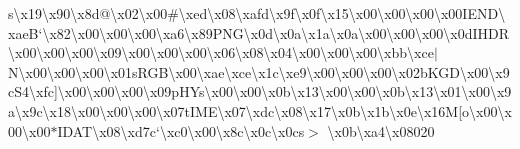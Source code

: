 \begin{DoxyCompactItemize}
s\textbackslash{}x19\textbackslash{}x90\textbackslash{}x8d@\textbackslash{}x02\textbackslash{}x00\#\textbackslash{}xed\textbackslash{}x08\textbackslash{}xafd\textbackslash{}x9f\textbackslash{}x0f\textbackslash{}x15\textbackslash{}x00\textbackslash{}x00\textbackslash{}x00\textbackslash{}x00\+I\+E\+N\+D\textbackslash{}xae\+B`\textbackslash{}x82\textbackslash{}x00\textbackslash{}x00\textbackslash{}x00\textbackslash{}xa6\textbackslash{}x89\+P\+N\+G\textbackslash{}x0d\textbackslash{}x0a\textbackslash{}x1a\textbackslash{}x0a\textbackslash{}x00\textbackslash{}x00\textbackslash{}x00\textbackslash{}x0d\+I\+H\+D\+R\textbackslash{}x00\textbackslash{}x00\textbackslash{}x00\textbackslash{}x09\textbackslash{}x00\textbackslash{}x00\textbackslash{}x00\textbackslash{}x06\textbackslash{}x08\textbackslash{}x04\textbackslash{}x00\textbackslash{}x00\textbackslash{}x00\textbackslash{}xbb\textbackslash{}xce$\vert$\+N\textbackslash{}x00\textbackslash{}x00\textbackslash{}x00\textbackslash{}x01s\+R\+G\+B\textbackslash{}x00\textbackslash{}xae\textbackslash{}xce\textbackslash{}x1c\textbackslash{}xe9\textbackslash{}x00\textbackslash{}x00\textbackslash{}x00\textbackslash{}x02b\+K\+G\+D\textbackslash{}x00\textbackslash{}x9c\+S4\textbackslash{}xfc\mbox{]}\textbackslash{}x00\textbackslash{}x00\textbackslash{}x00\textbackslash{}x09p\+H\+Ys\textbackslash{}x00\textbackslash{}x00\textbackslash{}x0b\textbackslash{}x13\textbackslash{}x00\textbackslash{}x00\textbackslash{}x0b\textbackslash{}x13\textbackslash{}x01\textbackslash{}x00\textbackslash{}x9a\textbackslash{}x9c\textbackslash{}x18\textbackslash{}x00\textbackslash{}x00\textbackslash{}x00\textbackslash{}x07t\+I\+M\+E\textbackslash{}x07\textbackslash{}xdc\textbackslash{}x08\textbackslash{}x17\textbackslash{}x0b\textbackslash{}x1b\textbackslash{}x0e\textbackslash{}x16\+M\mbox{[}o\textbackslash{}x00\textbackslash{}x00\textbackslash{}x00$\ast$\+I\+D\+A\+T\textbackslash{}x08\textbackslash{}xd7c`\textbackslash{}xc0\textbackslash{}x00\textbackslash{}x8c\textbackslash{}x0c\textbackslash{}x0cs$>$ \textbackslash{}x0b\textbackslash{}xa4\textbackslash{}x08020 
\end{DoxyCompactItemize}
